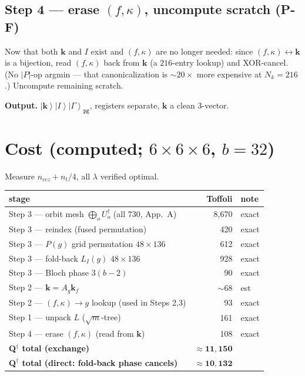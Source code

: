 \documentclass[11pt]{article}
\newcommand{\ket}[1]{\left|#1\right\rangle}
\newcommand{\reg}[1]{\texttt{#1}}
\begin{document}
\subsection*{Step 4 --- erase $(f,\kappa)$, uncompute scratch \hfill (P-F)}
Now that both $\mathbf k$ and $I$ exist and $(f,\kappa)$ are no longer needed: since
$(f,\kappa)\!\leftrightarrow\!\mathbf k$ is a bijection, read $(f,\kappa)$ back from $\mathbf k$ (a
$216$-entry lookup) and XOR-cancel. (No $|P|$-op argmin --- that canonicalization is $\sim\!20\times$
more expensive at $N_k=216$.) Uncompute remaining scratch.

\noindent\textbf{Output.} $\ket{\mathbf k}\ket{I}\ket{\Gamma}_{\reg{pg}}$, registers separate,
$\mathbf k$ a clean 3-vector.

\section{Cost (computed; $6\times6\times6$, $b=32$)}

Measure $n_{ccz}+n_t/4$, all $\lambda$ verified optimal.

\begin{center}
\begin{tabular}{@{}lrl@{}}
\toprule
stage & Toffoli & note \\ \midrule
Step 3 --- orbit mesh $\bigoplus_o U_o^\dagger$ (all $730$, App.\ A) & 8{,}670 & exact \\
Step 3 --- reindex (fused permutation) & 420 & exact \\
Step 3 --- $P(g)$ grid permutation $48\times136$ & 612 & exact \\
Step 3 --- fold-back $L_I(g)$ $48\times136$ & 928 & exact \\
Step 3 --- Bloch phase $3(b{-}2)$ & 90 & exact \\
Step 2 --- $\mathbf k=A_g\mathbf k_f$ & $\sim$68 & est \\
Step 2 --- $(f,\kappa)\!\to\!g$ lookup (used in Steps 2,3) & 93 & exact \\
Step 1 --- unpack $L$ ($\sqrt m$-tree) & 161 & exact \\
Step 4 --- erase $(f,\kappa)$ (read from $\mathbf k$) & 108 & exact \\ \midrule
\textbf{Q$^\dagger$ total (exchange)} & $\mathbf{\approx 11{,}150}$ & \\
\textbf{Q$^\dagger$ total (direct: fold-back phase cancels)} & $\mathbf{\approx 10{,}132}$ & \\
\bottomrule
\end{tabular}
\end{center}
\end{document}
